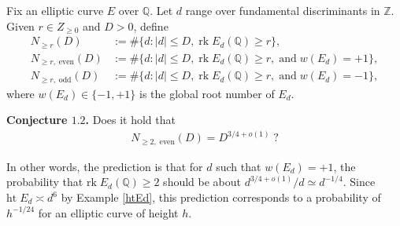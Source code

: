 \documentclass[12pt,reqno]{amsart}
\numberwithin{equation}{section}
\def\Z{{\mathbb Z}}
\def\Q{{\mathbb Q}}
\begin{document}
Fix an elliptic curve $E$ over $\Q$. Let $d$ range over fundamental discriminants in $\Z$. Given $r \in Z_{\ge 0}$ and $D>0$, define
\begin{align*}
N_{\ge r}(D)&:= \# \{d: |d| \le D, \; \text{rk} \; E_d(\Q) \ge r \},\\
N_{\ge r, \; \text{even}}(D)&:= \# \{d: |d| \le D, \; \text{rk} \; E_d(\Q) \ge r, \;\text{and} \; w(E_d) = +1 \}, \\
N_{\ge r, \; \text{odd}}(D)&:= \# \{d: |d| \le D, \; \text{rk} \; E_d(\Q) \ge r, \;\text{and} \; w(E_d) = -1 \},
\end{align*}
where $w(E_d) \in \{-1, +1\}$ is the global root number of $E_d$.

\smallskip
{\bf Conjecture $\mathbf{1.2}$.} Does it hold that
\begin{align*}
N_{\ge 2, \; \text{even}}(D) = D^{3/4 +o(1)}\; ?
\end{align*}

\smallskip

In other words, the prediction is that for $d$ such that $w(E_d) = +1$, the probability that $\text{rk} \; E_d(\Q) \ge 2$ should be about $d^{3/4+o(1)}/d \simeq d^{-1/4}$. Since $\text{ht} \; E_d \asymp d^6$ by Example \ref{htEd}, this prediction corresponds to a probability of $h^{-1/24}$ for an elliptic curve of height $h$.

\smallskip
\end{document}
